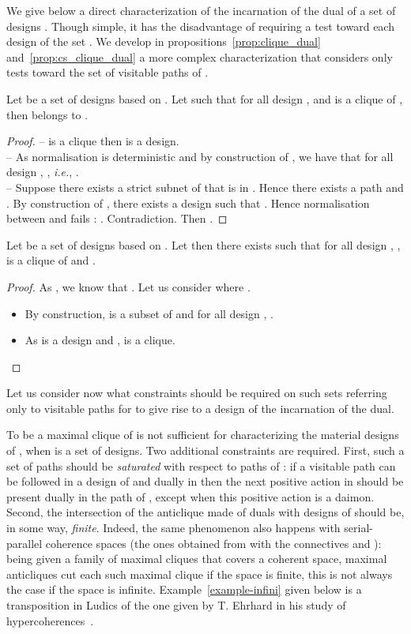 \documentclass{LMCS}
\def\ie{{\em i.e.}}
\begin{document}
We give below a direct characterization of the incarnation of the dual of a set of designs .
Though simple, it has the disadvantage of requiring a test toward each design of the set . We develop in propositions~\ref{prop:clique_dual} and~\ref{prop:cs_clique_dual} a more complex characterization that considers only tests toward the set of visitable paths of .

\begin{prop}
Let  be a set of designs based on . Let  such that for all design ,  and  is a clique of , then  belongs to .
\end{prop}
\begin{proof}
--  is a clique then  is a design.\\
-- As normalisation is deterministic and by construction of , we have that for all design , , \ie, .\\
-- Suppose there exists a strict subnet  of  that is in . Hence there exists a path  and . By construction of , there exists a design  such that . Hence normalisation between  and  fails : . Contradiction. Then .
\end{proof}

\begin{prop}
Let  be a set of designs based on . 
Let  then there exists  such that for all design , ,  is a clique of  and .
\end{prop}
\begin{proof}
As , we know that . Let us consider  where .
\begin{itemize}
\item By construction,  is a subset of  and for all design , . 
\item As  is a design and ,  is a clique.\qedhere
\end{itemize}
\end{proof}

Let us consider now what constraints should be required on such sets  referring only to visitable paths for  to give rise to a design of the incarnation of the dual.

To be a maximal clique of  is not sufficient for characterizing the material designs of , when  is a set of designs. 
Two additional constraints are required.
First, such a set of paths  should be {\em saturated} with respect to paths of : if a visitable path can be followed in a design  of  and dually in  then the next positive action in  should be present dually in the path of , except when this positive action is a daimon.
Second, the intersection of the anticlique made of duals with designs of  should be, in some way, {\em finite}.
Indeed, the same phenomenon also happens with serial-parallel coherence spaces (the ones obtained from  with the connectives  and ): being given a family of maximal cliques that covers a coherent space, maximal anticliques cut each such maximal clique if the space is finite, this is not always the case if the space is infinite. Example~\ref{example-infini} given below is a transposition in Ludics of the one given by T. Ehrhard in his study of hypercoherences~\cite{DBLP:journals/tcs/Ehrhard00}.
\end{document}
